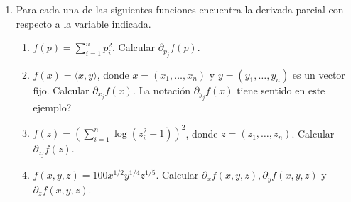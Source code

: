 \documentclass{article}
\theoremstyle{definition}
\begin{document}
\begin{enumerate}
         \item Para cada una de las siguientes funciones encuentra la derivada parcial con respecto a la variable indicada.
                \begin{enumerate}
                \item $f(p)=\sum_{i=1}^n p_i^2$. Calcular $\partial_{p_j}f(p)$.
                \item $f(x)=\langle x, y \rangle$, donde $x=(x_1,\dots, x_n)$ y $y=(y_1,\dots, y_n)$
                  es un vector fijo. Calcular
                  $\partial_{x_j}f(x)$. \textquestiondown La notaci\'on $\partial_{y_j}f(x)$ tiene sentido en este ejemplo?
                \item $f(z)=\left( \sum_{i=1}^n \log(z_i^2+1) \right)^2$,
                  donde $z=(z_1,\dots, z_n)$. Calcular $\partial_{z_j}f(z)$.
                \item $f(x,y,z)=100x^{1/2}y^{1/4}z^{1/5}$.
                  Calcular $\partial_xf(x,y,z), \partial_yf(x,y,z)$ y $\partial_zf(x,y,z)$.
                \end{enumerate}
       
                \end{enumerate}
   
       
\end{document}
